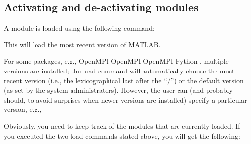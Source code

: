 \subsection{Activating and de-activating modules}

A module is loaded using the following command:

\ifantwerpen
\begin{prompt}
\end{prompt}
\fi
\ifbrussel
\begin{prompt}
\end{prompt}
\fi
\ifgent
\begin{prompt}
\end{prompt}
\fi
\ifleuven
\begin{prompt}
\end{prompt}
\fi

This will load the most recent version of MATLAB.

For some packages, e.g.,
\ifantwerpen
OpenMPI
\fi
\ifbrussel
OpenMPI
\fi
\ifgent
OpenMPI
\fi
\ifleuven
Python
\fi
, multiple versions are installed; the load
command will automatically choose the most recent version (i.e., the
lexicographical last after the ``/'') or the default version (as set by the
system administrators). However, the user can (and probably should, to avoid
surprises when newer versions are installed) specify a particular version,
e.g.,

\ifantwerpen
\begin{prompt}
\end{prompt}
\fi
\ifbrussel
\begin{prompt}
\end{prompt}
\fi
\ifgent
\begin{prompt}
\end{prompt}
\fi
\ifleuven
\begin{prompt}
\end{prompt}
\fi

Obviously, you need to keep track of the modules that are currently
loaded. If you executed the two load commands stated above, you will get the
following:

